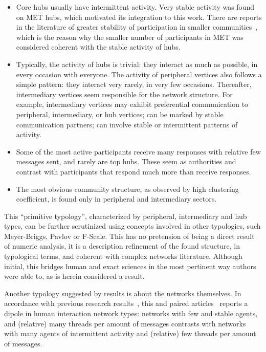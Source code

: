 \documentclass[%
 aip,
 jmp,%
 amsmath,amssymb,
 reprint,%
]{revtex4-1}
\begin{document}
\begin{itemize}
    \item Core hubs usually have intermittent activity. Very stable activity was found on MET hubs, which motivated its integration to this work. There are reports in the literature of greater stability of participation in smaller communities~\cite{barabasiEvo}, which is the reason why the smaller number of participants in MET was considered coherent with the stable activity of hubs.
    \item Typically, the activity of hubs is trivial: they interact as much as possible, in every occasion with everyone. The activity of peripheral vertices also follows a simple pattern: they interact very rarely, in very few occasions. Thereafter, intermediary vertices seem responsible for the network structure. For example, intermediary vertices may exhibit preferential communication to peripheral, intermediary, or hub vertices; can be marked by stable communication partners; can involve stable or intermittent patterns of activity.
    \item Some of the most active participants receive many responses with relative few messages sent, and rarely are top hubs. These seem as authorities and contrast with participants that respond much more than receive responses.
    \item The most obvious community structure, as observed by high clustering coefficient, is found only in peripheral and intermediary sectors.
\end{itemize}


This ``primitive typology'', characterized by peripheral, intermediary and hub types, can be further scrutinized using concepts involved in other typologies, such Meyer-Briggs, Pavlov or F-Scale. This has no pretension of being a direct result of numeric analysis, it is a description refinement of the found structure, in typological terms, and coherent with complex networks literature. Although initial, this bridges human and exact sciences in the most pertinent way authors were able to, as is herein considered a result.

Another typology suggested by results is about the networks themselves. In accordance with previous research results~\cite{barabasiEvo}, this and paired articles~\cite{rcText,versinus} reports a dipole in human interaction network types: networks with few and stable agents, and (relative) many threads per amount of messages contrasts with networks with many agents of intermittent activity and (relative) few threads per amount of messages.
 
\end{document}
